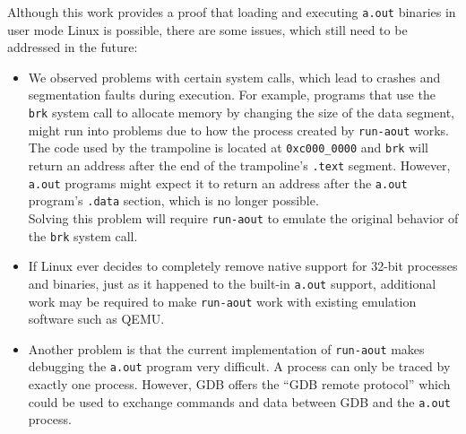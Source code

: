 \documentclass[draft,final]{vutinfth} %
\begin{document}
Although this work provides a proof that loading and executing \texttt{a.out} binaries in user mode Linux is possible, there are some issues, which still need to be addressed in the future:

\begin{itemize}
    \item We observed problems with certain system calls, which lead to crashes and segmentation faults during execution. For example, programs that use the \texttt{brk} system call to allocate memory by changing the size of the data segment, might run into problems due to how the process created by \texttt{run-aout} works.\\
    The code used by the trampoline is located at \texttt{0xc000\_0000} and \texttt{brk} will return an address after the end of the trampoline's \texttt{.text} segment. However, \texttt{a.out} programs might expect it to return an address after the \texttt{a.out} program's \texttt{.data} section, which is no longer possible.\\
    Solving this problem will require \texttt{run-aout} to emulate the original behavior of the \texttt{brk} system call.
    
    \item If Linux ever decides to completely remove native support for 32-bit processes and binaries, just as it happened to the built-in \texttt{a.out} support, additional work may be required to make \texttt{run-aout} work with existing emulation software such as QEMU.
    
    \item Another problem is that the current implementation of \texttt{run-aout} makes debugging the \texttt{a.out} program very difficult. A process can only be traced by exactly one process. However, GDB offers the ``GDB remote protocol'' \cite{GDBRemoteProtocol} which could be used to exchange commands and data between GDB and the \texttt{a.out} process.
\end{itemize}

\newpage
\printbibliography

\newpage
\listoffigures

\listoftables

\lstlistoflistings
\end{document}
